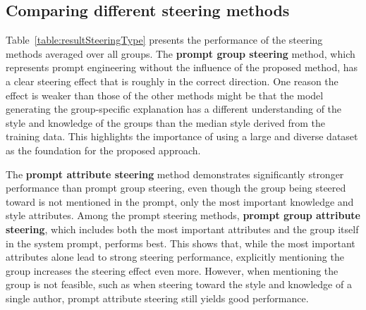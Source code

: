 \subsection{Comparing different steering methods}
\label{sec:evaluation:steering:methods}

Table~\ref{table:resultSteeringType} presents the performance of the steering methods averaged over all groups. The \textbf{prompt group steering} method, which represents prompt engineering without the influence of the proposed method, has a clear steering effect that is roughly in the correct direction. One reason the effect is weaker than those of the other methods might be that the model generating the group-specific explanation has a different understanding of the style and knowledge of the groups than the median style derived from the training data. This highlights the importance of using a large and diverse dataset as the foundation for the proposed approach.

\begin{table}[ht]
  \caption[]{This table shows the performance of different steering methods using the metrics displayed in Figure~\ref{fig:steeringMetrics}. The possible steering effect is not used in this experiment, because it is the same value of \num{10.4262} for all methods, as the values are averages over all groups. The experiment demonstrates that mentioning the attributes in the system prompt improves steering performance significantly. %
    Additionally, the experiment demonstrates that the newly proposed activation-based steering methods (see Section~\ref{sec:approach:steering}) lead to a clear improvement over prompt engineering techniques.}%
  \label{table:resultSteeringType}
  \centering
  \resultSteeringType{}%
\end{table}

The \textbf{prompt attribute steering} method demonstrates significantly stronger performance than prompt group steering, even though the group being steered toward is not mentioned in the prompt, only the most important knowledge and style attributes. Among the prompt steering methods, \textbf{prompt group attribute steering}, which includes both the most important attributes and the group itself in the system prompt, performs best. This shows that, while the most important attributes alone lead to strong steering performance, explicitly mentioning the group increases the steering effect even more. However, when mentioning the group is not feasible, such as when steering toward the style and knowledge of a single author, prompt attribute steering still yields good performance.


